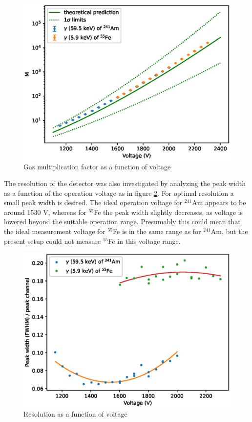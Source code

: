\documentclass[a4paper]{article}
\begin{document}
\begin{figure}[ht!]
\centering
\includegraphics[width=\textwidth]{fig/python/gas_mult.eps}
\caption{Gas multiplication factor as a function of voltage}
\label{fig:gas_mult}
\end{figure}

\FloatBarrier
The resolution of the detector was also investigated by analyzing the peak width as a function of the operation voltage as in figure \ref{fig:resolution}.
For optimal resolution a small peak width is desired.
The ideal operation voltage for $^{241}$Am appears to be around 1530 V, whereas for $^{55}$Fe the peak width slightly decreases, as voltage is lowered beyond the suitable operation range.
Presumably this could mean that the ideal measurement voltage for $^{55}$Fe is in the same range as for $^{241}$Am, but the present setup could not measure $^{55}$Fe in this voltage range.

\begin{figure}[ht!]
\centering
\includegraphics[width=\textwidth]{fig/python/resolution.eps}
\caption{Resolution as a function of voltage}
\label{fig:resolution}
\end{figure}
\end{document}

